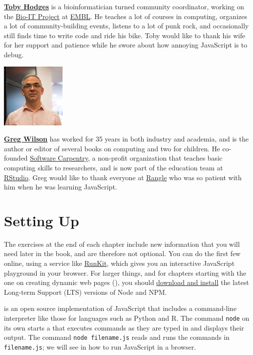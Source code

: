 \noindent
\textbf{\href{https://tbyhdgs.info/}{Toby Hodges}} is a bioinformatician turned community
coordinator, working on the \href{https://bio-it.embl.de}{Bio-IT Project} at
\href{https://www.embl.de}{EMBL}. He teaches a lot of courses in computing, organizes
a lot of community-building events, listens to a lot of punk rock, and
occasionally still finds time to write code and ride his bike. Toby would like
to thank his wife for her support and patience while he swore about how annoying
JavaScript is to debug.

\begin{center}
  \includegraphics{figures/wilson-greg.png}
\end{center}

\noindent
\textbf{\href{http://third-bit.com/}{Greg Wilson}} has worked for 35 years in both industry and
academia, and is the author or editor of several books on computing and two for
children. He co-founded \href{http://carpentries.org}{Software Carpentry}, a non-profit
organization that teaches basic computing skills to researchers, and is now part
of the education team at \href{http://rstudio.com}{RStudio}. Greg would like to
thank everyone at \href{https://rangle.io/}{Rangle} who was so patient with him when
he was learning JavaScript.

\section{Setting Up}\label{s:intro-setup}

The exercises at the end of each chapter include new information
that you will need later in the book,
and are therefore not optional.
You can do the first few online,
using a service like \href{https://runkit.com/}{RunKit},
which gives you an interactive JavaScript playground in your browser.
For larger things,
and for chapters starting with the one on creating dynamic web pages (),
you should \href{https://nodejs.org/en/download/}{download and install} the latest Long-term Support (LTS) versions of Node and NPM.

 is an open source implementation of JavaScript
that includes a command-line interpreter like those for languages such as Python and R.
The command \texttt{node} on its own starts a 
that executes commands as they are typed in and displays their output.
The command \texttt{node\ filename.js} reads and runs the commands in \texttt{filename.js};
we will see in  how to run JavaScript in a browser.

